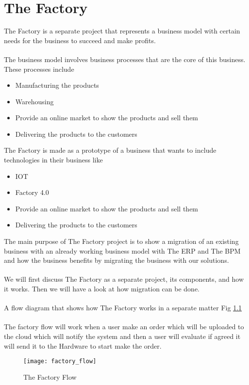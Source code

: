 \chapter{The Factory}
The Factory is a separate project that represents a business model with certain needs for the business
to succeed and make profits.\\\\
The business model involves business processes that are the core of this business. These processes
include
\begin{itemize}
    \item Manufacturing the products
    \item Warehousing
    \item Provide an online market to show the products and sell them
    \item Delivering the products to the customers
\end{itemize}

The Factory is made as a prototype of a business that wants to include technologies in their business
like
\begin{itemize}
    \item IOT
    \item Factory 4.0
    \item Provide an online market to show the products and sell them
    \item Delivering the products to the customers
\end{itemize}

The main purpose of The Factory project is to show a migration of an existing business with an
already working business model with The ERP and The BPM and how the business benefits by
migrating the business with our solutions.\\\\
We will first discuss The Factory as a separate project, its components, and how it works. Then we
will have a look at how migration can be done.\\\\
A flow diagram that shows how The Factory works in a separate matter Fig \ref{fig:factory_flow}\\\\

The factory flow will work when a user make an order which will be uploaded to the cloud which will notify the system and then a user will evaluate if agreed it will send it to the 
Hardware to start make the order.

\begin{figure}[h]
    \texttt{[image: factory\_flow]}
    \centering
    \caption{The Factory Flow}
    \label{fig:factory_flow}
\end{figure}


